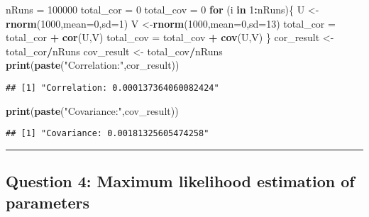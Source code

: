 \documentclass[]{article}
\newenvironment{Shaded}{\begin{snugshade}}{\end{snugshade}}
\newcommand{\KeywordTok}[1]{\textcolor[rgb]{0.13,0.29,0.53}{\textbf{#1}}}
\newcommand{\DataTypeTok}[1]{\textcolor[rgb]{0.13,0.29,0.53}{#1}}
\newcommand{\DecValTok}[1]{\textcolor[rgb]{0.00,0.00,0.81}{#1}}
\newcommand{\StringTok}[1]{\textcolor[rgb]{0.31,0.60,0.02}{#1}}
\newcommand{\ControlFlowTok}[1]{\textcolor[rgb]{0.13,0.29,0.53}{\textbf{#1}}}
\newcommand{\OperatorTok}[1]{\textcolor[rgb]{0.81,0.36,0.00}{\textbf{#1}}}
\newcommand{\NormalTok}[1]{#1}
\begin{document}
\begin{Shaded}
\begin{Highlighting}[]
\NormalTok{nRuns =}\StringTok{ }\DecValTok{100000}
\NormalTok{total_cor =}\StringTok{ }\DecValTok{0}
\NormalTok{total_cov =}\StringTok{ }\DecValTok{0}
\ControlFlowTok{for}\NormalTok{ (i }\ControlFlowTok{in} \DecValTok{1}\OperatorTok{:}\NormalTok{nRuns)\{}
\NormalTok{    U <-}\KeywordTok{rnorm}\NormalTok{(}\DecValTok{1000}\NormalTok{,}\DataTypeTok{mean=}\DecValTok{0}\NormalTok{,}\DataTypeTok{sd=}\DecValTok{1}\NormalTok{)}
\NormalTok{    V <-}\KeywordTok{rnorm}\NormalTok{(}\DecValTok{1000}\NormalTok{,}\DataTypeTok{mean=}\DecValTok{0}\NormalTok{,}\DataTypeTok{sd=}\DecValTok{13}\NormalTok{)}
\NormalTok{    total_cor =}\StringTok{ }\NormalTok{total_cor }\OperatorTok{+}\StringTok{ }\KeywordTok{cor}\NormalTok{(U,V)}
\NormalTok{    total_cov =}\StringTok{ }\NormalTok{total_cov }\OperatorTok{+}\StringTok{ }\KeywordTok{cov}\NormalTok{(U,V)}
\NormalTok{\}}
\NormalTok{cor_result <-}\StringTok{ }\NormalTok{total_cor}\OperatorTok{/}\NormalTok{nRuns}
\NormalTok{cov_result <-}\StringTok{ }\NormalTok{total_cov}\OperatorTok{/}\NormalTok{nRuns}
\KeywordTok{print}\NormalTok{(}\KeywordTok{paste}\NormalTok{(}\StringTok{"Correlation:"}\NormalTok{,cor_result))}
\end{Highlighting}
\end{Shaded}

\begin{verbatim}
## [1] "Correlation: 0.000137364060082424"
\end{verbatim}

\begin{Shaded}
\begin{Highlighting}[]
\KeywordTok{print}\NormalTok{(}\KeywordTok{paste}\NormalTok{(}\StringTok{"Covariance:"}\NormalTok{,cov_result))}
\end{Highlighting}
\end{Shaded}

\begin{verbatim}
## [1] "Covariance: 0.00181325605474258"
\end{verbatim}

\begin{center}\rule{0.5\linewidth}{\linethickness}\end{center}

\subsection{Question 4: Maximum likelihood estimation of
parameters}\label{question-4-maximum-likelihood-estimation-of-parameters}
\end{document}
